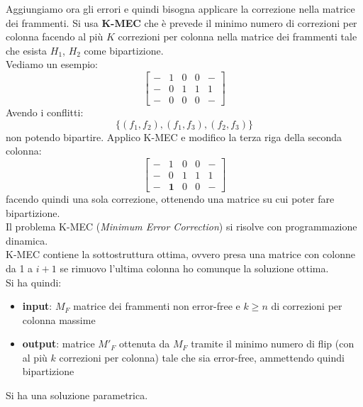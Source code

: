\documentclass[a4paper,12pt, oneside]{book}
\begin{document}
\begin{esempio}
  Aggiungiamo ora gli errori e quindi bisogna applicare la correzione nella
  matrice dei frammenti. Si usa \textbf{K-MEC} che è prevede il minimo numero di
  correzioni per colonna facendo al più $K$ correzioni per colonna nella
  matrice dei frammenti tale che esista $H_1$, $H_2$ come bipartizione.\\
  Vediamo un esempio:
  \[
    \left[
      \begin{matrix}
        - & 1 & 0 & 0 & -\\
        - & 0 & 1 & 1 & 1\\
        - & 0 & 0 & 0 & -
      \end{matrix}
    \right]
  \]
  Avendo i conflitti:
  \[\{(f_1,f_2),(f_1,f_3),(f_2,f_3)\}\]
  non potendo bipartire. Applico K-MEC e modifico la terza riga della seconda
  colonna:
   \[
    \left[
      \begin{matrix}
        - & 1 & 0 & 0 & -\\
        - & 0 & 1 & 1 & 1\\
        - & \mathbf{1} & 0 & 0 & -
      \end{matrix}
    \right]
  \]
  facendo quindi una sola correzione, ottenendo una matrice su cui poter fare
  bipartizione. \\
  Il problema K-MEC (\textit{Minimum Error Correction}) si risolve con
  programmazione dinamica. \\ 
  K-MEC contiene la sottostruttura ottima, ovvero presa una matrice con colonne
  da 1 a $i+1$ se rimuovo l'ultima colonna ho comunque la soluzione ottima.\\
  Si ha quindi:
  \begin{itemize}
    \item \textbf{input}: $M_F$ matrice dei frammenti non error-free e $k\geq n$
    di correzioni per colonna massime
    \item \textbf{output}: matrice $M'_F$ ottenuta da $M_F$ tramite il minimo
    numero di flip (con al più $k$ correzioni per colonna) tale che sia
    error-free, ammettendo quindi bipartizione
  \end{itemize}
  Si ha una soluzione parametrica.
\end{esempio}
\end{document}
